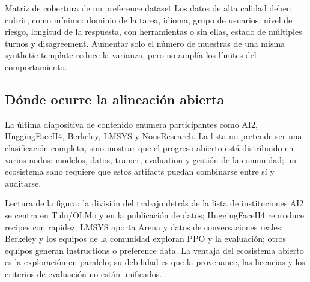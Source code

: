 
\begin{importantbox}{Matriz de cobertura de un preference dataset}
Los datos de alta calidad deben cubrir, como mínimo: dominio de la tarea, idioma, grupo de usuarios, nivel de riesgo, longitud de la respuesta, con herramientas o sin ellas, estado de múltiples turnos y disagreement. Aumentar solo el número de muestras de una misma synthetic template reduce la varianza, pero no amplía los límites del comportamiento.
\end{importantbox}


\subsection{Dónde ocurre la alineación abierta}

La última diapositiva de contenido enumera participantes como AI2, HuggingFaceH4, Berkeley, LMSYS y NousResearch. La lista no pretende ser una clasificación completa, sino mostrar que el progreso abierto está distribuido en varios nodos: modelos, datos, trainer, evaluation y gestión de la comunidad; un ecosistema sano requiere que estos artifacts puedan combinarse entre sí y auditarse.


\begin{knowledgebox}{Lectura de la figura: la división del trabajo detrás de la lista de instituciones}
AI2 se centra en Tulu/OLMo y en la publicación de datos; HuggingFaceH4 reproduce recipes con rapidez; LMSYS aporta Arena y datos de conversaciones reales; Berkeley y los equipos de la comunidad exploran PPO y la evaluación; otros equipos generan instructions o preference data. La ventaja del ecosistema abierto es la exploración en paralelo; su debilidad es que la provenance, las licencias y los criterios de evaluación no están unificados.
\end{knowledgebox}

